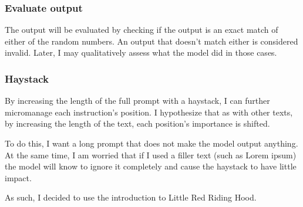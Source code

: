 \subsubsection{Evaluate output}

The output will be evaluated by checking if the output is an exact match of
either of the random numbers. An output that doesn't match either is considered
invalid. Later, I may qualitatively assess what the model did in those cases.

\subsubsection{Haystack}

By increasing the length of the full prompt with a haystack, I can further
micromanage each instruction's position. I hypothesize that as with other texts,
by increasing the length of the text, each position's importance is shifted.

To do this, I want a long prompt that does not make the model output anything.
At the same time, I am worried that if I used a filler text (such as Lorem
ipsum) the model will know to ignore it completely and cause the haystack to
have little impact.

As such, I decided to use the introduction to Little Red Riding Hood.

